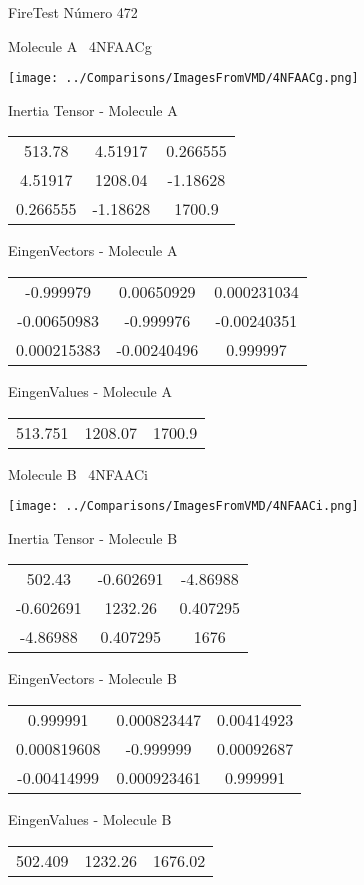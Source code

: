 \vtab[-3cm]
\begin{center}
{\large FireTest \tab Número 472}
\end{center}
\begin{multicols}{2}
\begin{center}

Molecule A \
4NFAACg

\texttt{[image: ../Comparisons/ImagesFromVMD/4NFAACg.png]}

Inertia Tensor - Molecule A \\
\begin{tabular}{|c c c|}
513.78	 & 	4.51917	 & 	0.266555	 \\
4.51917	 & 	1208.04	 & 	-1.18628	 \\
0.266555	 & 	-1.18628	 & 	1700.9
\end{tabular}

\vtab
 EingenVectors - Molecule A     \\
\begin{tabular}{|c c c|}
-0.999979	 & 	0.00650929	 & 	0.000231034	 \\
-0.00650983	 & 	-0.999976	 & 	-0.00240351	 \\
0.000215383	 & 	-0.00240496	 & 	0.999997
\end{tabular}

\vtab
 EingenValues - Molecule A     \\
\begin{tabular}{|c c c|}
513.751	 & 	1208.07	 & 	1700.9	 \\
\end{tabular}
\columnbreak

Molecule B \
4NFAACi

\texttt{[image: ../Comparisons/ImagesFromVMD/4NFAACi.png]}

Inertia Tensor - Molecule B \\
\begin{tabular}{|c c c|}
502.43	 & 	-0.602691	 & 	-4.86988	 \\
-0.602691	 & 	1232.26	 & 	0.407295	 \\
-4.86988	 & 	0.407295	 & 	1676
\end{tabular}

\vtab
 EingenVectors - Molecule B     \\
\begin{tabular}{|c c c|}
0.999991	 & 	0.000823447	 & 	0.00414923	 \\
0.000819608	 & 	-0.999999	 & 	0.00092687	 \\
-0.00414999	 & 	0.000923461	 & 	0.999991
\end{tabular}

\vtab
 EingenValues - Molecule B     \\
\begin{tabular}{|c c c|}
502.409	 & 	1232.26	 & 	1676.02	 \\
\end{tabular}

\end{center}
\end{multicols}

